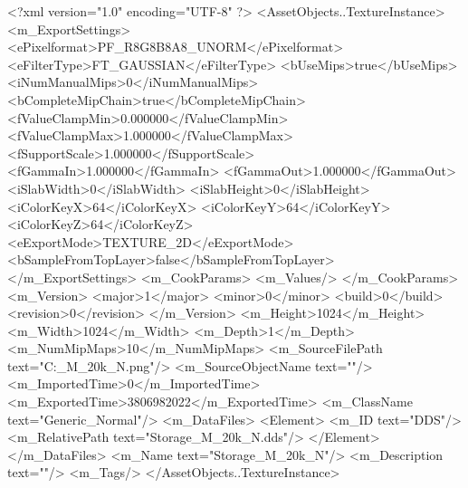 <?xml version="1.0" encoding="UTF-8" ?>
<AssetObjects..TextureInstance>
	<m_ExportSettings>
		<ePixelformat>PF_R8G8B8A8_UNORM</ePixelformat>
		<eFilterType>FT_GAUSSIAN</eFilterType>
		<bUseMips>true</bUseMips>
		<iNumManualMips>0</iNumManualMips>
		<bCompleteMipChain>true</bCompleteMipChain>
		<fValueClampMin>0.000000</fValueClampMin>
		<fValueClampMax>1.000000</fValueClampMax>
		<fSupportScale>1.000000</fSupportScale>
		<fGammaIn>1.000000</fGammaIn>
		<fGammaOut>1.000000</fGammaOut>
		<iSlabWidth>0</iSlabWidth>
		<iSlabHeight>0</iSlabHeight>
		<iColorKeyX>64</iColorKeyX>
		<iColorKeyY>64</iColorKeyY>
		<iColorKeyZ>64</iColorKeyZ>
		<eExportMode>TEXTURE_2D</eExportMode>
		<bSampleFromTopLayer>false</bSampleFromTopLayer>
	</m_ExportSettings>
	<m_CookParams>
		<m_Values/>
	</m_CookParams>
	<m_Version>
		<major>1</major>
		<minor>0</minor>
		<build>0</build>
		<revision>0</revision>
	</m_Version>
	<m_Height>1024</m_Height>
	<m_Width>1024</m_Width>
	<m_Depth>1</m_Depth>
	<m_NumMipMaps>10</m_NumMipMaps>
	<m_SourceFilePath text="C:\Users\Shadow\Desktop\Prototypes\Storage_M_20k_N.png"/>
	<m_SourceObjectName text=""/>
	<m_ImportedTime>0</m_ImportedTime>
	<m_ExportedTime>3806982022</m_ExportedTime>
	<m_ClassName text="Generic_Normal"/>
	<m_DataFiles>
		<Element>
			<m_ID text="DDS"/>
			<m_RelativePath text="Storage_M_20k_N.dds"/>
		</Element>
	</m_DataFiles>
	<m_Name text="Storage_M_20k_N"/>
	<m_Description text=""/>
	<m_Tags/>
</AssetObjects..TextureInstance>

